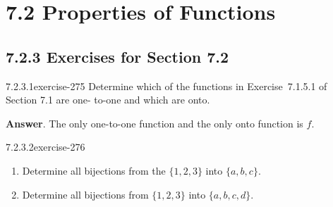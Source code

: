 \documentclass[twoside,10pt,]{book}
\numberwithin{equation}{section}
\begin{document}
\section*{7.2 Properties of Functions}
\subsection*{7.2.3 Exercises for Section 7.2}
\begin{divisionsolution}{7.2.3.1}{}{exercise-275}%
\hypertarget{p-2344}{}%
Determine which of the functions in Exercise~7.1.5.1 of Section 7.1 are one- to-one and which are onto.%
\par\smallskip%
\noindent\textbf{Answer}.\quad%
\hypertarget{p-2345}{}%
The only one-to-one function and the only onto function is \(f\).%
\end{divisionsolution}%
\begin{divisionsolution}{7.2.3.2}{}{exercise-276}%
\hypertarget{p-2346}{}%
\leavevmode%
\begin{enumerate}[label=(\alph*)]
\item\hypertarget{li-1202}{}\hypertarget{p-2347}{}%
Determine all bijections from the \(\{1, 2, 3\}\) into \(\{a, b, c\}\).%
\item\hypertarget{li-1203}{}\hypertarget{p-2348}{}%
Determine all bijections from \(\{1, 2, 3\}\) into \(\{a, b, c, d\}\).%
\end{enumerate}
%
\end{divisionsolution}%
\end{document}
